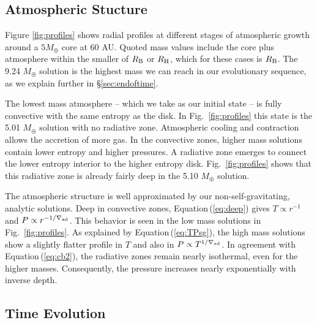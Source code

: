 \documentclass[apj, numberedappendix]{emulateapj}
\newcommand{\Eq}[1]{Equation\,(\ref{#1})}
\newcommand{\Fig}[1]{Fig.~\ref{#1}}
\newcommand{\delad}{\nabla_{\rm ad}}
\newcommand{\RB}{R_{\rm B}}
\newcommand{\RH}{R_{\rm H}}
\begin{document}
\subsection{Atmospheric Stucture}
\label{sec:profiles}
Figure \ref{fig:profiles} shows radial profiles at different stages of atmospheric growth around a $5 M_{\oplus}$ core at $60$ AU.  Quoted mass values include the core plus atmosphere within the smaller of $\RB$ or $\RH$, which for these cases is $\RB$.  The 9.24 $M_{\oplus}$ solution is the highest mass we can reach in our evolutionary sequence, as we explain further in \S\ref{sec:endoftime}.

The lowest mass atmosphere -- which we take as our initial state -- is fully convective with the same entropy as the disk.  In \Fig{fig:profiles} this state is the 5.01 $M_{\oplus}$ solution with no radiative zone.  Atmospheric cooling and contraction allows the accretion of more gas.  In the convective zones, higher mass solutions contain lower entropy and higher pressures.  A radiative zone emerges to connect the lower entropy interior to the higher entropy disk.  \Fig{fig:profiles} shows that this radiative zone is already fairly deep in the 5.10 $M_\oplus$ solution. 
 
The atmospheric structure is well approximated by our non-self-gravitating, analytic solutions.  Deep in convective zones, \Eq{eq:deep} gives $T \propto r^{-1}$ and $P\propto r^{-1/\delad}$.  This behavior is seen in the low mass solutions in \Fig{fig:profiles}.  As explained by \Eq{eq:TPsg}, the high mass solutions show a slightly flatter profile in $T$ and also in $P \propto T^{1/\delad}$.  In agreement with \Eq{eq:cb2}, the radiative zones remain nearly isothermal, even for the higher masses.  Consequently, the pressure increases nearly exponentially with inverse depth.  


\subsection{Time Evolution}\label{sec:timeev}
\end{document}
